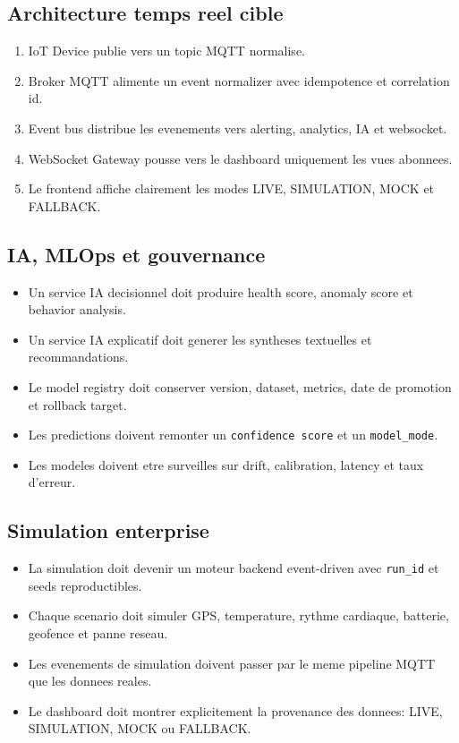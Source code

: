 \documentclass[12pt,a4paper]{article}
\begin{document}
\subsection{Architecture temps reel cible}
\begin{enumerate}
  \item IoT Device publie vers un topic MQTT normalise.
  \item Broker MQTT alimente un event normalizer avec idempotence et correlation id.
  \item Event bus distribue les evenements vers alerting, analytics, IA et websocket.
  \item WebSocket Gateway pousse vers le dashboard uniquement les vues abonnees.
  \item Le frontend affiche clairement les modes LIVE, SIMULATION, MOCK et FALLBACK.
\end{enumerate}

\subsection{IA, MLOps et gouvernance}
\begin{itemize}
  \item Un service IA decisionnel doit produire health score, anomaly score et behavior analysis.
  \item Un service IA explicatif doit generer les syntheses textuelles et recommandations.
  \item Le model registry doit conserver version, dataset, metrics, date de promotion et rollback target.
  \item Les predictions doivent remonter un \texttt{confidence score} et un \texttt{model\_mode}.
  \item Les modeles doivent etre surveilles sur drift, calibration, latency et taux d'erreur.
\end{itemize}

\subsection{Simulation enterprise}
\begin{itemize}
  \item La simulation doit devenir un moteur backend event-driven avec \texttt{run\_id} et seeds reproductibles.
  \item Chaque scenario doit simuler GPS, temperature, rythme cardiaque, batterie, geofence et panne reseau.
  \item Les evenements de simulation doivent passer par le meme pipeline MQTT que les donnees reales.
  \item Le dashboard doit montrer explicitement la provenance des donnees: LIVE, SIMULATION, MOCK ou FALLBACK.
\end{itemize}
\end{document}
